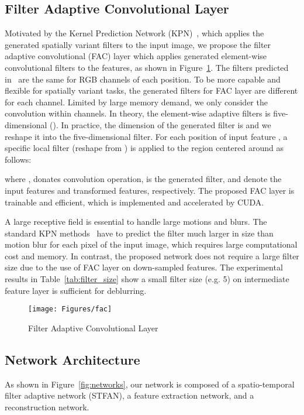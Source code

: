 \documentclass[10pt,twocolumn,letterpaper]{article}
\begin{document}
\subsection{Filter Adaptive Convolutional Layer}\label{sec:kac}
Motivated by the Kernel Prediction Network (KPN)~\cite{jia2016dynamic, niklaus2017video, mildenhall2018burst}, which applies the generated spatially variant filters to the input image,
we propose the filter adaptive convolutional (FAC) layer which applies generated element-wise convolutional filters to the features, as shown in Figure~\ref{fig:kac}.
The filters predicted in~\cite{jia2016dynamic, niklaus2017video, mildenhall2018burst} are the same for RGB channels of each position.
To be more capable and flexible for spatially variant tasks, the generated filters for FAC layer are different for each channel.
Limited by large memory demand, we only consider the convolution within channels.
In theory, the element-wise adaptive filters is five-dimensional ().
In practice, the dimension of the generated filter  is  and we reshape it into the five-dimensional filter.
For each position  of input feature , a specific local filter  (reshape from ) is applied to the region centered around  as follows:

where ,  donates convolution operation,  is the generated filter,  and  denote the input features and transformed features, respectively.
The proposed FAC layer is trainable and efficient, which is implemented and accelerated by CUDA.


A large receptive field is essential to handle large motions and blurs.
The standard KPN methods~\cite{jia2016dynamic, niklaus2017video, mildenhall2018burst} have to predict the filter much larger in size than motion blur for each pixel of the input image, which requires large computational cost and memory.
In contrast, the proposed network does not require a large filter size due to the use of FAC layer on down-sampled features. 
The experimental results in Table~\ref{tab:filter_size} show a small filter size (e.g. 5) on intermediate feature layer is sufficient for deblurring.
\begin{figure}
\centering
\resizebox{0.9\linewidth}{!} {
	\texttt{[image: Figures/fac]}
}
\caption{Filter Adaptive Convolutional Layer}
\vspace{-8px}
\label{fig:kac}
\end{figure}
\subsection{Network Architecture}\label{sec:arch}
As shown in Figure~\ref{fig:networks}, our network is composed of a spatio-temporal filter adaptive network (STFAN), a feature extraction network, and a reconstruction network.
\end{document}
